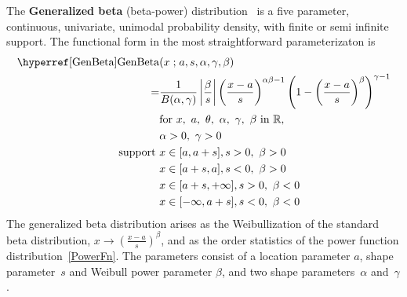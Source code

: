 


\label{sec:GenBeta}
{} 

The {\bf Generalized beta} (beta-power)  distribution~\cite{McDonald1984} is a five parameter,  continuous, univariate, unimodal probability density, with finite or semi infinite support. The functional form in the most straightforward parameterizaton is
\begin{align}
\label{GenBeta}
\opr{GenBeta}&(x\given a,s,\alpha, \gamma,\beta) 
\\    = & 
 \frac{1}{B(\alpha, \gamma)} \left|\frac{\beta}{s}\right|
\left(\frac{x-a}{s} \right)^{\alpha \beta -1} \left (1-\left(\frac{x-a}{s}\right)^\beta\right)^{\gamma -1}
\notag
\checked
\\
& \text{for } x,\ a,\ \theta,\ \alpha,\ \gamma,\ \beta\  \text{in } \mathbb{R}, 
\notag
\\ & \alpha>0, \  \gamma >0
\notag
 \\ \text{ support } \checked & x \in [a,a+s], s>0,\ \beta>0 \notag
  \\  &  x\in[a+s,a], s<0,\ \beta>0 
 \notag 
 \\  \notag  &  x\in[a+s,+\infty], s>0,\ \beta<0 
 \\  \notag  &  x\in[-\infty,a+s], s<0,\ \beta<0 
\notag
\end{align}
The generalized beta distribution arises as the Weibullization of the standard beta distribution, $x\rightarrow (\tfrac{x-a}{s})^{\beta}$, and as the order statistics of the power function distribution~\eqref{PowerFn}. The parameters consist of a location parameter $a$, shape parameter~$s$ and Weibull power parameter $\beta$, and two shape parameters~$\alpha$ and~$\gamma$.




